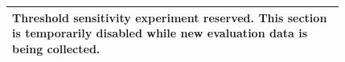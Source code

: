 \begin{tabular}{p{0.82\linewidth}}
\toprule
\textbf{Threshold sensitivity experiment reserved.} This section is temporarily disabled while new evaluation data is being collected. \\
\bottomrule
\end{tabular}
